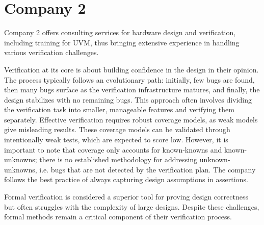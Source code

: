 \documentclass[12pt]{book}
\begin{document}
\begin{comment}
- use the different UVM runtime phases extensively, especially reset phases, to increase composition
- UVM factory is difficult to debug, and hard to maintain
- callbacks would be the bettern option but weren't available when UVM was drafted

- have their own standard scoreboard implementation

- UVM is not perfect, some companies insisted on things from their own methodology

- use configDB to pass data to agents

- RAL is not finished in their opinion
- e.g. one reg block can't be mapped into multiple address spaces
- developed their own extension

- UVM examples on the internet are often outdated
- only showcase small and trivial examples

- power aware verification is still difficult

- like idea of a framework without too many choices
\end{comment}

\section{Company 2}

Company 2 offers consulting services for hardware design and verification, including training for UVM, thus bringing
extensive experience in handling various verification challenges.

Verification at its core is about building confidence in the design in their opinion. The process typically follows
an evolutionary path: initially, few bugs are found, then many bugs surface as the verification infrastructure
matures, and finally, the design stabilizes with no remaining bugs. This approach often involves dividing the
verification task into smaller, manageable features and verifying them separately. Effective verification requires
robust coverage models, as weak models give misleading results. These coverage models can be validated through
intentionally weak tests, which are expected to score low. However, it is important to note that coverage only
accounts for known-knowns and known-unknowns; there is no established methodology for addressing unknown-unknowns,
i.e. bugs that are not detected by the verification plan. The company follows the best practice of always capturing
design assumptions in assertions.

Formal verification is considered a superior tool for proving design correctness but often struggles with the
complexity of large designs. Despite these challenges, formal methods remain a critical component of their verification process.
\end{document}
